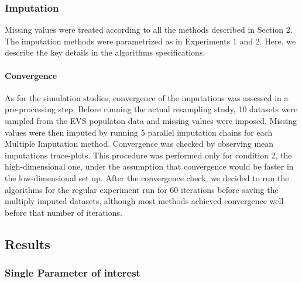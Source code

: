 \subsubsection{Imputation}
	
	Missing values were treated according to all the methods described in Section 2.
	The imputation methods were parametrized as in Experiments 1 and 2.
	Here, we describe the key details in the algorithms specifications.

	\paragraph{Convergence}

	As for the simulation studies, convergence of the imputations was assessed in a pre-processing step.
	Before running the actual resampling study, 10 datasets were sampled from the EVS populaton data and missing 
	values were imposed.
	Missing values were then imputed by running 5 parallel imputation chains for each Multiple Imputation 
	method.
	Convergence was checked by observing mean imputations trace-plots.
	This procedure was performed only for condition 2, the high-dimensional one, under the assumption that convergence
	would be faster in the low-dimensional set up.
	After the convergence check, we decided to run the algorithms for the regular experiment run for 60 iterations 
	before saving the multiply imputed datasets, although most methods achieved convergence well before that number 
	of iterations.

\subsection{Results}

	\subsubsection{Single Parameter of interest}

